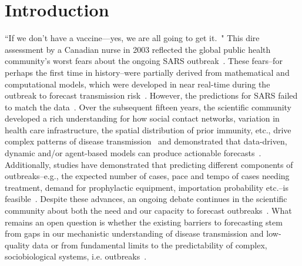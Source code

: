 \documentclass[fleqn,12pt]{wlscirep}
\begin{document}
\section*{Introduction}
``If we don’t have a vaccine—yes, we are all going to get it.~\cite{shaw2007sars}" This dire assessment by a Canadian nurse in 2003 reflected the global public health community's worst fears about the ongoing SARS outbreak~\cite{dye2003modeling, colizza2007predictability}. These fears--for perhaps the first time in history--were partially derived from mathematical and computational models, which were developed in near real-time during the outbreak to forecast transmission risk~\cite{chretien2015advancing, colizza2007predictability}.  However, the predictions for SARS failed to match the data~\cite{meyers2005network, colizza2007predictability}.  Over the subsequent fifteen years, the scientific community developed a rich understanding for how social contact networks, variation in health care infrastructure, the spatial distribution of prior immunity, etc., drive complex patterns of disease transmission~\cite{perra2015modeling, gandon2016forecasting, reich2016challenges, viboud2018rapidd, peak2018population, wesolowski2015impact} and demonstrated that data-driven, dynamic and\slash or agent-based models can produce actionable forecasts~\cite{bansal2016big, funk2016real, pastore2016real, lofgren2014opinion, chowell2017perspectives, ray2018prediction}. Additionally, studies have demonstrated that predicting different components of outbreaks--e.g., the expected number of cases, pace and tempo of cases needing treatment, demand for prophylactic equipment, importation probability etc.--is feasible~\cite{colizza2007predictability, shaman:RealTime, venkatramanan2017using, johansson2016evaluating, brooks2015flexible, funk2016real, chowell2016using, zhang2015social, nsoesie2013simulation}.  Despite these advances, an ongoing debate continues in the scientific community about both the need and our capacity to forecast outbreaks~\cite{holmes2018pandemics, rivers2018modelling}. What remains an open question is whether the existing barriers to forecasting stem from gaps in our mechanistic understanding of disease transmission and low-quality data or from fundamental limits to the predictability of complex, sociobiological systems, i.e. outbreaks~\cite{hufnagel2004forecast, perra2015modeling, moran2016epidemic, gandon2016forecasting, chretien2015advancing,biggerstaff2016results,ostpForecasting}.
\end{document}
